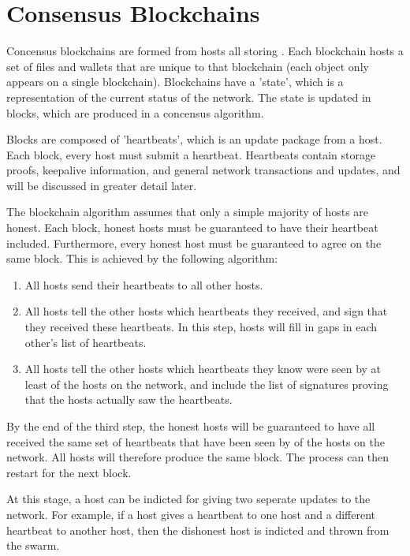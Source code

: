 \documentclass[twocolumn]{article}
\begin{document}
\section{Consensus Blockchains}

Concensus blockchains are formed from \numhosts{} hosts all storing \storageperhost{}.
Each blockchain hosts a set of files and wallets that are unique to that blockchain (each object only appears on a single blockchain).
Blockchains have a 'state', which is a representation of the current status of the network.
The state is updated in blocks, which are produced in a concensus algorithm.

Blocks are composed of 'heartbeats', which is an update package from a host.
Each block, every host must submit a heartbeat.
Heartbeats contain storage proofs, keepalive information, and general network transactions and updates, and will be discussed in greater detail later.

The blockchain algorithm assumes that only a simple majority of hosts are honest.
Each block, honest hosts must be guaranteed to have their heartbeat included.
Furthermore, every honest host must be guaranteed to agree on the same block.
This is achieved by the following algorithm:

\begin{enumerate}
	\item All hosts send their heartbeats to all other hosts.
	\item All hosts tell the other hosts which heartbeats they received, and sign that they received these heartbeats.
	In this step, hosts will fill in gaps in each other's list of heartbeats.
	\item All hosts tell the other hosts which heartbeats they know were seen by at least \fiftyone{} of the hosts on the network, and include the list of signatures proving that the hosts actually saw the heartbeats.
\end{enumerate}

By the end of the third step, the honest hosts will be guaranteed to have all received the same set of heartbeats that have been seen by \fiftyone{} of the hosts on the network.
All hosts will therefore produce the same block.
The process can then restart for the next block.

At this stage, a host can be indicted for giving two seperate updates to the network.
For example, if a host gives a heartbeat to one host and a different heartbeat to another host, then the dishonest host is indicted and thrown from the swarm.
\end{document}
